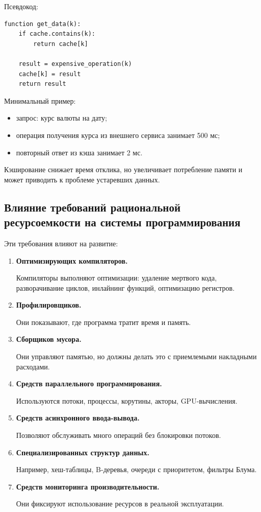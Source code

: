 \documentclass[12pt,a4paper]{article}
\begin{document}
Псевдокод:
\begin{verbatim}
function get_data(k):
    if cache.contains(k):
        return cache[k]

    result = expensive_operation(k)
    cache[k] = result
    return result
\end{verbatim}

Минимальный пример:
\begin{itemize}
    \item запрос: курс валюты на дату;
    \item операция получения курса из внешнего сервиса занимает 500 мс;
    \item повторный ответ из кэша занимает 2 мс.
\end{itemize}

Кэширование снижает время отклика, но увеличивает потребление памяти и может приводить к проблеме устаревших данных.

\subsection{Влияние требований рациональной ресурсоемкости на системы программирования}

Эти требования влияют на развитие:

\begin{enumerate}
    \item \textbf{Оптимизирующих компиляторов.}

    Компиляторы выполняют оптимизации: удаление мертвого кода, разворачивание циклов, инлайнинг функций, оптимизацию регистров.

    \item \textbf{Профилировщиков.}

    Они показывают, где программа тратит время и память.

    \item \textbf{Сборщиков мусора.}

    Они управляют памятью, но должны делать это с приемлемыми накладными расходами.

    \item \textbf{Средств параллельного программирования.}

    Используются потоки, процессы, корутины, акторы, GPU-вычисления.

    \item \textbf{Средств асинхронного ввода-вывода.}

    Позволяют обслуживать много операций без блокировки потоков.

    \item \textbf{Специализированных структур данных.}

    Например, хеш-таблицы, B-деревья, очереди с приоритетом, фильтры Блума.

    \item \textbf{Средств мониторинга производительности.}

    Они фиксируют использование ресурсов в реальной эксплуатации.
\end{enumerate}
\end{document}
